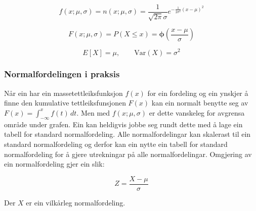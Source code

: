 \begin{equation}
    f(x; \mu, \sigma) = n(x; \mu, \sigma) = \frac{1}{\sqrt{2\pi}\sigma} e^{-\frac{1}{2\sigma^2}(x-\mu)^2}
\end{equation}

\begin{equation}
    F(x; \mu, \sigma) = P(X \leq x) = \boldsymbol{\phi}\left(\frac{x - \mu}{\sigma}\right)
\end{equation}

\begin{equation}
    E[X] = \mu, \qquad \text{Var}(X) = \sigma^2
\end{equation}

\subsubsection{Normalfordelingen i praksis}

Når ein har ein massetettleiksfunksjon $f(x)$ for ein fordeling og ein ynskjer å finne den kumulative tettleiksfunsjonen $F(x)$ kan ein normalt benytte seg av $F(x) = \int_{-\infty}^{x} f(t) \,dt$. Men med
$f(x; \mu, \sigma)$ er dette vanskeleg for avgrensa område under grafen. Ein kan heldigvis jobbe seg rundt dette med å lage ein tabell for standard normalfordeling.  Alle normalfordelingar kan skalerast til ein standard normalfordeling og derfor kan ein nytte ein tabell for standard normalfordeling for å gjere utrekningar på alle normalfordelingar. Omgjering av ein normalfordeling gjer ein slik:

\begin{equation}
    Z = \frac{X - \mu}{\sigma}
\end{equation}

Der $X$ er ein vilkårleg normalfordeling. 

